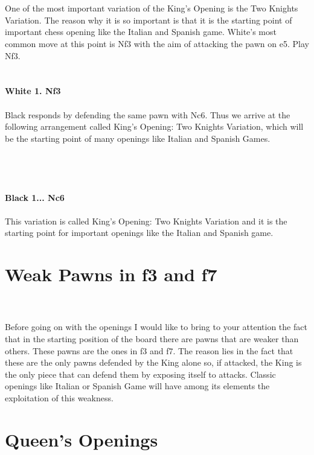 \documentclass{article}
\begin{document}
\\
\\
One of the most important variation of the King's Opening is the Two Knights Variation. The reason why it is so important is that it is the starting point of important chess opening like the Italian and Spanish game. White's most common move at this point is Nf3 with the aim of attacking the pawn on e5. Play Nf3.\\

\\
\\
\textbf{White 1. Nf3}\\
\\
Black responds by defending the same pawn with Nc6. Thus we arrive at the following arrangement called King's Opening: Two Knights Variation, which will be the starting point of many openings like Italian and Spanish Games.\\\\
\\

\\
\\
\textbf{Black 1... Nc6}\\
\\
This variation is called King's Opening: Two Knights Variation and it is the starting point for important openings like the Italian and Spanish game.\\\section{ Weak Pawns in f3 and f7}

\\
\\
Before going on with the openings I would like to bring to your attention the fact that in the starting position of the board there are pawns that are weaker than others. These pawns are the ones in f3 and f7. The reason lies in the fact that these are the only pawns defended by the King alone so, if attacked, the King is the only piece that can defend them by exposing itself to attacks. Classic openings like Italian or Spanish Game will have among its elements the exploitation of this weakness.\section{ Queen's Openings}
\end{document}
